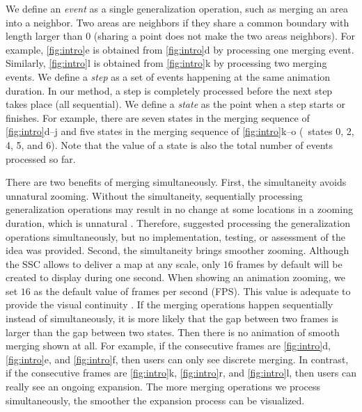 \documentclass[twocolumn]{svjour3}          %
\begin{document}
We define an \emph{event} as a single generalization operation, 
such as merging an area into a neighbor.
Two areas are neighbors if they share a common boundary with length larger than 0
(sharing a point does not make the two areas neighbors).
For example, \fig\ref{fig:intro}e is obtained from 
\fig\ref{fig:intro}d by processing one merging event.
Similarly, \fig\ref{fig:intro}l is obtained from 
\fig\ref{fig:intro}k by processing two merging events.
We define a \emph{step} as 
a set of events happening at the same animation duration.
In our method, a step is completely processed 
before the next step takes place (all sequential).
We define a \emph{state} as the point when a step starts or finishes.
For example, there are seven states 
in the merging sequence of \figs\ref{fig:intro}d--j
and five states in the merging sequence of \figs\ref{fig:intro}k--o 
(\ie~states 0, 2, 4, 5, and 6).
Note that the value of a state is also 
the total number of events processed so far.


There are two benefits of merging simultaneously.
First, the simultaneity avoids unnatural zooming.
Without the simultaneity,
sequentially processing generalization operations 
may result in no change at some locations in a zooming duration, 
which is unnatural \citep{vanOosterom2014Support}. 
Therefore, \citet{vanOosterom2014Support} 
suggested processing the generalization operations simultaneously,
but no implementation, testing, or assessment of the idea was provided.
Second, the simultaneity brings smoother zooming.
Although the SSC allows to deliver a map at any scale,
only $16$ frames by default will be created to display during one second.
When showing an animation zooming, 
we set $16$ as the default value of frames per second (FPS).
This value is adequate to provide the visual continuity
\citep[]{Read2000Film}.
If the merging operations happen sequentially instead of simultaneously,
it is more likely that
the gap between two frames is larger than the gap between two states.
Then there is no animation of smooth merging shown at all.
For example, if the consecutive frames are 
\figs\ref{fig:intro}d, \ref{fig:intro}e, and \ref{fig:intro}f,
then users can only see discrete merging.
In contrast, if the consecutive frames are 
\figs\ref{fig:intro}k, \ref{fig:intro}r, and \ref{fig:intro}l,
then users can really see an ongoing expansion. 
The more merging operations we process simultaneously, 
the smoother the expansion process can be visualized.

\end{document}
